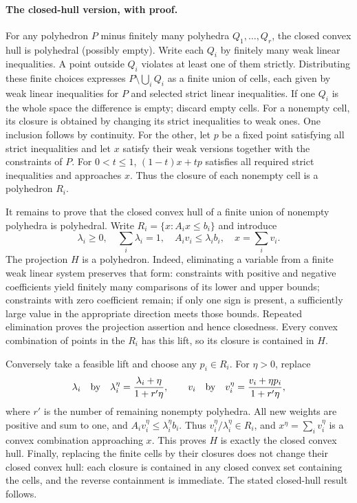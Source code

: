 \documentclass[11pt]{article}
\begin{document}
\paragraph{The closed-hull version, with proof.}
For any polyhedron $P$ minus finitely many polyhedra $Q_1,\ldots,Q_r$,
the closed convex hull is polyhedral (possibly empty). Write each $Q_i$ by
finitely many weak linear inequalities. A point outside $Q_i$ violates at
least one of them strictly. Distributing these finite choices expresses
$P\setminus\bigcup_iQ_i$ as a finite union of cells, each given by weak
linear inequalities for $P$ and selected strict linear inequalities.
If one $Q_i$ is the whole space the difference is empty; discard empty cells.
For a nonempty cell, its closure is obtained by changing its strict inequalities
to weak ones. One inclusion follows by continuity. For the other, let $p$
be a fixed point satisfying all strict inequalities and let $x$ satisfy their
weak versions together with the constraints of $P$. For $0<t\le1$,
$(1-t)x+tp$ satisfies all required strict inequalities and approaches $x$.
Thus the closure of each nonempty cell is a polyhedron $R_i$.

It remains to prove that the closed convex hull of a finite union of nonempty
polyhedra is polyhedral. Write $R_i=\{x:A_ix\le b_i\}$ and introduce
\[
\lambda_i\ge0,\quad \sum_i\lambda_i=1,\quad
A_i v_i\le\lambda_i b_i,\quad x=\sum_i v_i.
\]
The projection $H$ is a polyhedron. Indeed, eliminating a variable from a
finite weak linear system preserves that form: constraints with positive and
negative coefficients yield finitely many comparisons of its lower and upper
bounds; constraints with zero coefficient remain; if only one sign is present,
a sufficiently large value in the appropriate direction meets those bounds.
Repeated elimination proves the projection assertion and hence closedness.
Every convex combination of points in the $R_i$ has this lift, so its closure
is contained in $H$.

Conversely take a feasible lift and choose any $p_i\in R_i$. For $\eta>0$,
replace
\[
\lambda_i\quad\hbox{by}\quad
\lambda_i^\eta=\frac{\lambda_i+\eta}{1+r'\eta},\qquad
v_i\quad\hbox{by}\quad
v_i^\eta=\frac{v_i+\eta p_i}{1+r'\eta},
\]
where $r'$ is the number of remaining nonempty polyhedra.
All new weights are positive and sum to one, and
$A_i v_i^\eta\le\lambda_i^\eta b_i$.
Thus $v_i^\eta/\lambda_i^\eta\in R_i$, and
$x^\eta=\sum_i v_i^\eta$ is a convex combination approaching $x$.
This proves $H$ is exactly the closed convex hull. Finally, replacing the
finite cells by their closures does not change their closed convex hull:
each closure is contained in any closed convex set containing the cells,
and the reverse containment is immediate. The stated closed-hull result follows.
\end{document}
